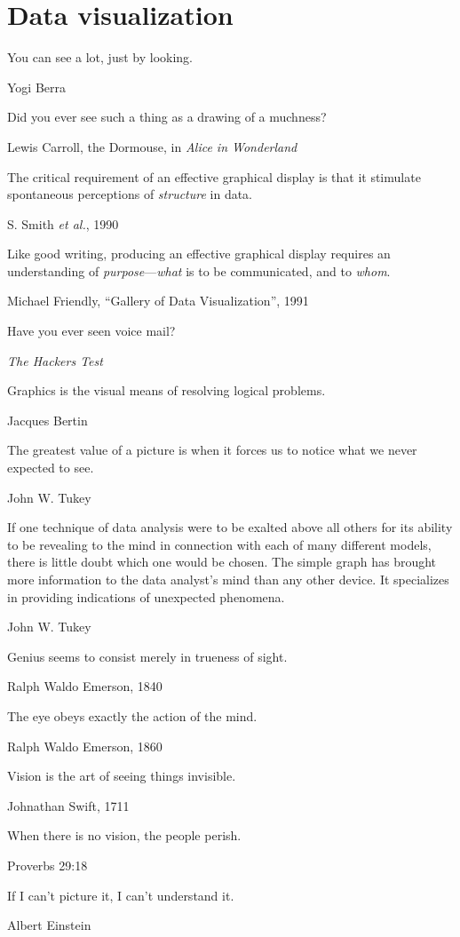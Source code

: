 
\section{Data visualization}

\epigraph{You can see a lot, just by looking.}{Yogi Berra}

\epigraph{Did you ever see such a thing as a drawing of a muchness?}{Lewis Carroll, the Dormouse, in \emph{Alice in Wonderland}}

\epigraph{The critical requirement of an effective graphical display is that it stimulate spontaneous perceptions of \emph{structure} in data.}{S. Smith \emph{et al.}, 1990}

\epigraph{Like good writing, producing an effective graphical display requires an understanding of \emph{purpose}---\emph{what} is to be communicated, and to \emph{whom}.}{Michael Friendly, ``Gallery of Data Visualization'', 1991}

\epigraph{Have you ever seen voice mail?}{\emph{The Hackers Test}}

\epigraph{Graphics is the visual means of resolving logical problems.}{Jacques Bertin \citet[p. 16]{Bertin:81}}

\epigraph{The greatest value of a picture is when it forces us to notice what we never expected to see.}{John W. Tukey \citet[p. vi]{Tukey:77}}

\epigraph{If one technique of data analysis were to be exalted above all others for its ability to be revealing to the mind in connection with each of many different models, there is little doubt which one would be chosen. The simple graph has brought more information to the data analyst's mind than any other device. It specializes in providing indications of unexpected phenomena.}{John W. Tukey \citet[p. 49]{Tukey:1962}}

\epigraph{Genius seems to consist merely in trueness of sight.}{Ralph Waldo Emerson, 1840}

\epigraph{The eye obeys exactly the action of the mind.}{Ralph Waldo Emerson, 1860}

\epigraph{Vision is the art of seeing things invisible.}{Johnathan Swift, 1711}

\epigraph{When there is no vision, the people perish.}{Proverbs 29:18}

\epigraph{If I can't picture it, I can't understand it.}{Albert Einstein}

